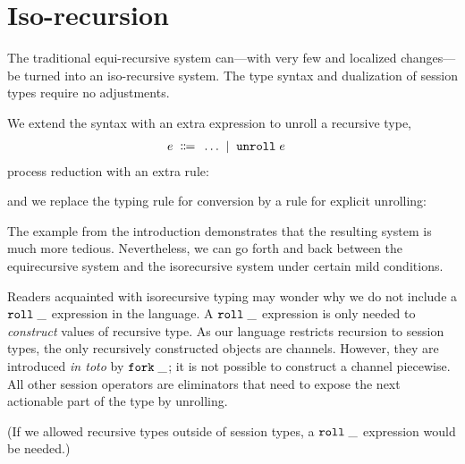 \section{Iso-recursion}
\label{sec:iso-recursion}

The traditional equi-recursive system can---with very few and localized changes---be turned
into an iso-recursive system. The type syntax and dualization of
session types require no adjustments.

We extend the syntax with an extra expression to unroll a recursive
type,
\begin{align*}
    e \grmdef&
      \dots \grmor \EUnroll e
\end{align*}
%
process reduction with an extra rule:
%
\begin{mathpar}
\end{mathpar}
%
and we replace the typing rule for conversion by a rule for explicit unrolling:
\begin{mathpar}
\end{mathpar}

The example from the introduction demonstrates that the resulting
system is much more tedious. Nevertheless, we can go forth and back
between the equirecursive system and the isorecursive system under
certain mild conditions.

Readers acquainted with isorecursive typing may wonder why we do not
include a $\ERoll\_$ expression in the language. A $\ERoll\_$
expression is only needed to \emph{construct} values of recursive
type. As our language restricts recursion to session types, the only
recursively constructed objects are channels. However, they are
introduced \emph{in toto} by $\EFork\_$; it is not possible to
construct a channel piecewise. All other session operators are
eliminators that need to expose the next actionable part of the type
by unrolling.

(If we allowed recursive types outside of session types, a
$\ERoll\_$ expression would be needed.)

